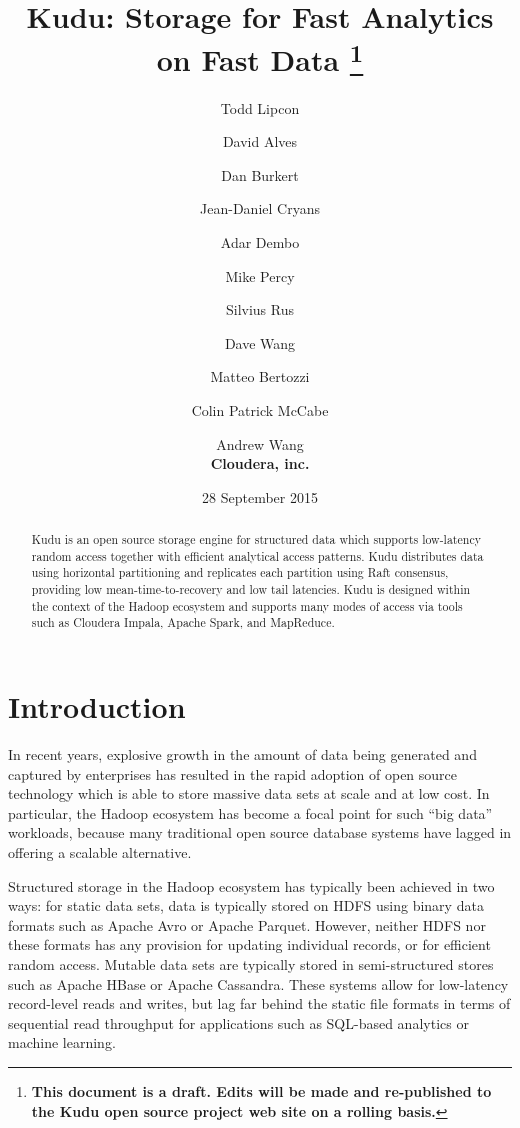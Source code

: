 \documentclass[twocolumn,9pt]{article}
\begin{document}
\title{Kudu: Storage for Fast Analytics on Fast Data
\footnote{\bf
This document is a draft. Edits will be made and re-published to the Kudu
open source project web site on a rolling basis.}
}
\author{
  Todd Lipcon \and David Alves \and Dan Burkert \and Jean-Daniel Cryans \and Adar Dembo \and
  Mike Percy \and Silvius Rus \and Dave Wang \and Matteo Bertozzi \and Colin Patrick McCabe \and
  Andrew Wang\\
  {\small \bf Cloudera, inc.}
}

\date{28 September 2015}

\maketitle

\begin{abstract}
Kudu is an open source storage engine for structured data which supports low-latency random access
together with efficient analytical access patterns. Kudu distributes data using
horizontal partitioning and replicates each partition using Raft consensus, providing low
mean-time-to-recovery and low tail latencies. Kudu is designed within the context of the Hadoop
ecosystem and supports many modes of access via tools such as Cloudera Impala\cite{impala},
Apache Spark\cite{spark}, and MapReduce\cite{mapreduce}.
\end{abstract}

\section{Introduction}
\label{sec:introduction}
In recent years, explosive growth in the amount of data being generated and captured by
enterprises has resulted in the rapid adoption of open source technology which is able to
store massive data sets at scale and at low cost. In particular, the Hadoop ecosystem has become a focal
point for such ``big data'' workloads, because many traditional open source database systems have
lagged in offering a scalable alternative.

Structured storage in the Hadoop ecosystem has typically been achieved in two ways: for static data sets,
data is typically stored on HDFS using binary data formats such as Apache Avro\cite{avro} or
Apache Parquet\cite{parquet}. However, neither HDFS nor these formats has any provision for updating
individual records, or for efficient random access. Mutable data sets are typically stored in
semi-structured stores such as Apache HBase\cite{hbase} or Apache Cassandra\cite{cassandra}. These systems allow for low-latency
record-level reads and writes, but lag far behind the static file formats in terms of sequential
read throughput for applications such as SQL-based analytics or machine learning.
\end{document}
